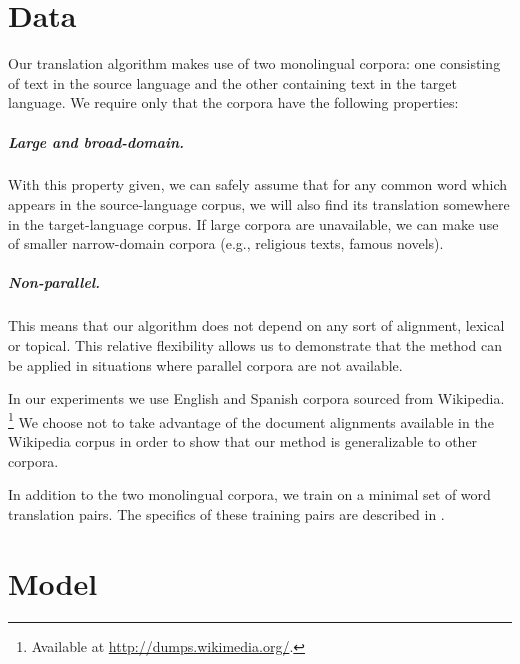\documentclass[11pt]{article}
\begin{document}

\section{Data}
\label{sec:data}

Our translation algorithm makes use of two monolingual corpora: one consisting
of text in the source language and the other containing text in the target
language. We require only that the corpora have the following properties:

\subparagraph{Large and broad-domain.} With this property given, we can safely
assume that for any common word which appears in the source-language corpus, we
will also find its translation somewhere in the target-language corpus. If large
corpora are unavailable, we can make use of smaller narrow-domain corpora (e.g.,
religious texts, famous novels).

\subparagraph{Non-parallel.} This means that our algorithm does not depend on
any sort of alignment, lexical or topical. This relative flexibility allows us
to demonstrate that the method can be applied in situations where parallel
corpora are not available.

In our experiments we use English and Spanish corpora sourced from Wikipedia.%
\footnote{Available at \url{http://dumps.wikimedia.org/}.} We choose not to take
advantage of the document alignments available in the Wikipedia corpus in order
to show that our method is generalizable to other corpora.

In addition to the two monolingual corpora, we train on a minimal set of word
translation pairs. The specifics of these training pairs are described in
.

\section{Model}
\label{sec:model}
\end{document}
